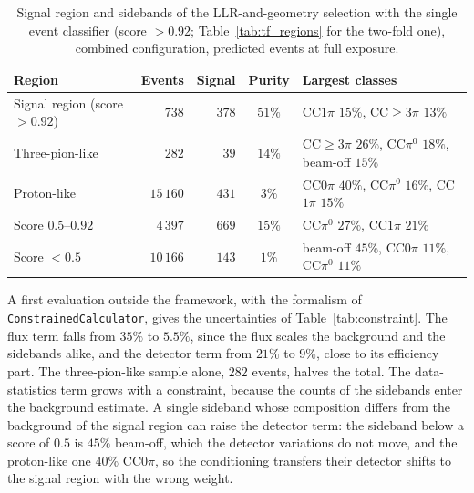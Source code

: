 \documentclass[11pt,a4paper]{article}
\begin{document}
\begin{table}[H]
  \centering
  \caption{Signal region and sidebands of the LLR-and-geometry selection with the single event classifier (score
    $>0.92$; Table~\ref{tab:tf_regions} for the two-fold one), combined configuration, predicted
    events at full exposure.}
  \label{tab:regions}
  \small
  \begin{tabular}{lrrcl}
    \toprule
    Region & Events & Signal & Purity & Largest classes \\
    \midrule
    Signal region (score $>0.92$)   & $738$       & $378$ & $51\%$ & CC$1\pi$ $15\%$, CC$\geq3\pi$ $13\%$ \\
    Three-pion-like                 & $282$       & $39$  & $14\%$ & CC$\geq3\pi$ $26\%$, CC$\pi^0$ $18\%$, beam-off $15\%$ \\
    Proton-like                     & $15\,160$   & $431$ & $3\%$  & CC$0\pi$ $40\%$, CC$\pi^0$ $16\%$, CC$1\pi$ $15\%$ \\
    Score $0.5$--$0.92$             & $4\,397$    & $669$ & $15\%$ & CC$\pi^0$ $27\%$, CC$1\pi$ $21\%$ \\
    Score $<0.5$                    & $10\,166$   & $143$ & $1\%$  & beam-off $45\%$, CC$0\pi$ $11\%$, CC$\pi^0$ $11\%$ \\
    \bottomrule
  \end{tabular}
\end{table}

A first evaluation outside the framework, with the formalism of \texttt{ConstrainedCalculator},
gives the uncertainties of Table~\ref{tab:constraint}. The flux term falls from $35\%$ to $5.5\%$, since
the flux scales the background and the sidebands alike, and the detector term from $21\%$ to $9\%$,
close to its efficiency part. The three-pion-like sample alone, $282$ events, halves the total. The
data-statistics term grows with a constraint, because the counts of the sidebands enter the background
estimate. A single sideband whose composition differs from the background of the signal region can raise the
detector term: the sideband below a score of $0.5$ is $45\%$ beam-off, which the detector variations do not move,
and the proton-like one $40\%$ CC$0\pi$, so the conditioning transfers their detector shifts to the signal region
with the wrong weight.
\end{document}
